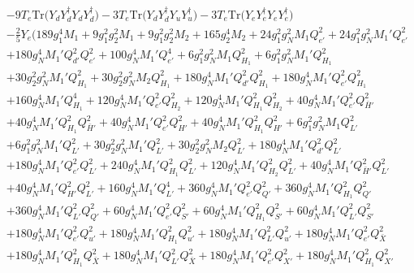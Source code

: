 {\begin{align}
 &-9 T_e \mbox{Tr}\Big({Y_d  Y_{d}^{\dagger}  Y_d  Y_{d}^{\dagger}}\Big) -3 T_e \mbox{Tr}\Big({Y_d  Y_{d}^{\dagger}  Y_u  Y_{u}^{\dagger}}\Big) -3 T_e \mbox{Tr}\Big({Y_e  Y_{e}^{\dagger}  Y_e  Y_{e}^{\dagger}}\Big) \nonumber \\ 
 &-\frac{2}{5} Y_e \Big(189 g_{1}^{4} M_1 +9 g_{1}^{2} g_{2}^{2} M_1 +9 g_{1}^{2} g_{2}^{2} M_2 +165 g_{2}^{4} M_2 +24 g_{1}^{2} g_{N}^{2} M_1 Q_{e'}^{2} +24 g_{1}^{2} g_{N}^{2} M_1' Q_{e'}^{2} \nonumber \\ 
 &+180 g_{N}^{4} M_1' Q_{d'}^{2} Q_{e'}^{2} +100 g_{N}^{4} M_1' Q_{e'}^{4} +6 g_{1}^{2} g_{N}^{2} M_1 Q_{H_1}^{2} +6 g_{1}^{2} g_{N}^{2} M_1' Q_{H_1}^{2} \nonumber \\ 
 &+30 g_{2}^{2} g_{N}^{2} M_1' Q_{H_1}^{2} +30 g_{2}^{2} g_{N}^{2} M_2 Q_{H_1}^{2} +180 g_{N}^{4} M_1' Q_{d'}^{2} Q_{H_1}^{2} +180 g_{N}^{4} M_1' Q_{e'}^{2} Q_{H_1}^{2} \nonumber \\ 
 &+160 g_{N}^{4} M_1' Q_{H_1}^{4} +120 g_{N}^{4} M_1' Q_{e'}^{2} Q_{H_2}^{2} +120 g_{N}^{4} M_1' Q_{H_1}^{2} Q_{H_2}^{2} +40 g_{N}^{4} M_1' Q_{e'}^{2} Q_{\bar{H}'}^{2} \nonumber \\ 
 &+40 g_{N}^{4} M_1' Q_{H_1}^{2} Q_{\bar{H}'}^{2} +40 g_{N}^{4} M_1' Q_{e'}^{2} Q_{H'}^{2} +40 g_{N}^{4} M_1' Q_{H_1}^{2} Q_{H'}^{2} +6 g_{1}^{2} g_{N}^{2} M_1 Q_{L'}^{2} \nonumber \\ 
 &+6 g_{1}^{2} g_{N}^{2} M_1' Q_{L'}^{2} +30 g_{2}^{2} g_{N}^{2} M_1' Q_{L'}^{2} +30 g_{2}^{2} g_{N}^{2} M_2 Q_{L'}^{2} +180 g_{N}^{4} M_1' Q_{d'}^{2} Q_{L'}^{2} \nonumber \\ 
 &+180 g_{N}^{4} M_1' Q_{e'}^{2} Q_{L'}^{2} +240 g_{N}^{4} M_1' Q_{H_1}^{2} Q_{L'}^{2} +120 g_{N}^{4} M_1' Q_{H_2}^{2} Q_{L'}^{2} +40 g_{N}^{4} M_1' Q_{\bar{H}'}^{2} Q_{L'}^{2} \nonumber \\ 
 &+40 g_{N}^{4} M_1' Q_{H'}^{2} Q_{L'}^{2} +160 g_{N}^{4} M_1' Q_{L'}^{4} +360 g_{N}^{4} M_1' Q_{e'}^{2} Q_{Q'}^{2} +360 g_{N}^{4} M_1' Q_{H_1}^{2} Q_{Q'}^{2} \nonumber \\ 
 &+360 g_{N}^{4} M_1' Q_{L'}^{2} Q_{Q'}^{2} +60 g_{N}^{4} M_1' Q_{e'}^{2} Q_{S'}^{2} +60 g_{N}^{4} M_1' Q_{H_1}^{2} Q_{S'}^{2} +60 g_{N}^{4} M_1' Q_{L'}^{2} Q_{S'}^{2} \nonumber \\ 
 &+180 g_{N}^{4} M_1' Q_{e'}^{2} Q_{u'}^{2} +180 g_{N}^{4} M_1' Q_{H_1}^{2} Q_{u'}^{2} +180 g_{N}^{4} M_1' Q_{L'}^{2} Q_{u'}^{2} +180 g_{N}^{4} M_1' Q_{e'}^{2} Q_{\bar{X}}^{2} \nonumber \\ 
 &+180 g_{N}^{4} M_1' Q_{H_1}^{2} Q_{\bar{X}}^{2} +180 g_{N}^{4} M_1' Q_{L'}^{2} Q_{\bar{X}}^{2} +180 g_{N}^{4} M_1' Q_{e'}^{2} Q_{X'}^{2} +180 g_{N}^{4} M_1' Q_{H_1}^{2} Q_{X'}^{2} \nonumber \\ 

\end{align}}
